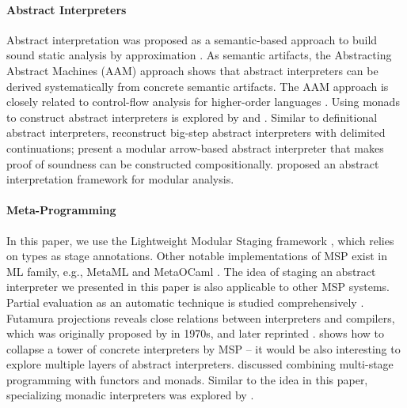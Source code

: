 \paragraph{Abstract Interpreters} Abstract interpretation was proposed as a
semantic-based approach to build sound static analysis by approximation
\cite{DBLP:conf/popl/CousotC77}. As semantic artifacts, the Abstracting Abstract
Machines (AAM) \cite{DBLP:journals/jfp/HornM12, DBLP:conf/icfp/HornM10} approach
shows that abstract interpreters can be derived systematically from concrete
semantic artifacts. The AAM approach is closely related to control-flow analysis
for higher-order languages \cite{Midtgaard:2012:CAF:2187671.2187672}.
Using monads to construct abstract interpreters is explored by
\citet{Sergey:2013:MAI:2491956.2491979} and
\citet{DBLP:journals/pacmpl/DaraisLNH17, Darais:2015:GTM:2814270.2814308}.
Similar to definitional abstract interpreters, \citet{Wei:2018:RAA:3243631.3236800}
reconstruct big-step abstract interpreters with delimited continuations;
\citet{Keidel:2018:CSP:3243631.3236767} present a modular arrow-based abstract
interpreter that makes proof of soundness can be constructed compositionally.
\citet{DBLP:conf/cc/CousotC02} proposed an abstract interpretation framework for
modular analysis.

\paragraph{Meta-Programming} In this paper, we use the Lightweight Modular
Staging framework \cite{DBLP:conf/gpce/RompfO10}, which relies on types as stage
annotations. Other notable implementations of MSP exist in ML family, e.g.,
MetaML \cite{DBLP:conf/pepm/TahaS97} and MetaOCaml
\cite{DBLP:conf/gpce/CalcagnoTHL03, DBLP:conf/flops/Kiselyov14}.
The idea of staging an abstract interpreter we presented in this paper is also
applicable to other MSP systems. Partial evaluation as an automatic technique is
studied comprehensively \cite{10.1007/3-540-61580-6_11,
DBLP:books/daglib/0072559}. Futamura projections reveals close relations between
interpreters and compilers, which was originally proposed by
\citeauthor{futamura1971partial} in 1970s\cite{futamura1971partial}, and later
reprinted \cite{Futamura1999}.
\citeauthor{Amin:2017:CTI:3177123.3158140} shows how to collapse a tower of
concrete interpreters by MSP -- it would be also interesting to explore multiple
layers of abstract interpreters.
\citet{10.1007/11561347_18} discussed combining
multi-stage programming with functors and monads.
Similar to the idea in this paper, specializing monadic interpreters was
explored by \citet{DBLP:conf/dsl/SheardBP99, danvy1991compiling}.

